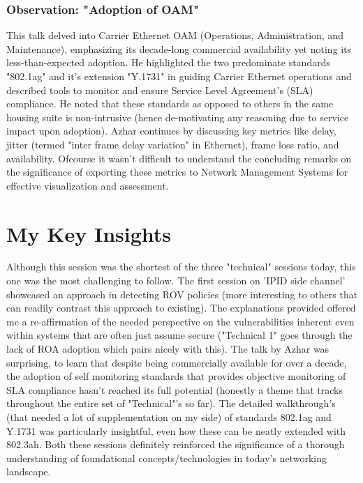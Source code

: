 \documentclass[twocolumn]{article}
\begin{document}
\subsubsection*{Observation: "Adoption of OAM"}
This talk delved into Carrier Ethernet OAM (Operations, Administration, and Maintenance), emphasizing its decade-long commercial availability yet noting its less-than-expected adoption. He highlighted the two predominate standards "802.1ag" and it's extension "Y.1731" in guiding Carrier Ethernet operations and described tools to monitor and ensure Service Level Agreement's (SLA) compliance. He noted that these standards as opposed to others in the same housing suite is non-intrusive (hence de-motivating any reasoning due to service impact upon adoption). Azhar continues by discussing key metrics like delay, jitter (termed "inter frame delay variation" in Ethernet), frame loss ratio, and availability. Ofcourse it wasn't difficult to understand the concluding remarks on the significance of exporting these metrics to Network Management Systems for effective visualization and assessment.

\section*{My Key Insights}
Although this session was the shortest of the three "technical" sessions today, this one was the most challenging to follow. The first session on 'IPID side channel' showcased an approach in detecting ROV policies (more interesting to others that can readily contrast this approach to existing). The explanations provided offered me a re-affirmation of the needed perspective on the vulnerabilities inherent even within systems that are often just assume secure ("Technical 1" goes through the lack of ROA adoption which pairs nicely with this). The talk by Azhar was surprising, to learn that despite being commercially available for over a decade, the adoption of self monitoring standards that provides objective monitoring of SLA compliance hasn't reached its full potential (honestly a theme that tracks throughout the entire set of "Technical"'s so far). The detailed walkthrough's (that needed a lot of supplementation on my side) of standards 802.1ag and Y.1731 was particularly insightful, even how these can be neatly extended with 802.3ah. Both these sessions definitely reinforced the significance of a thorough understanding of foundational concepts/technologies in today's networking landscape.


\newpage
\end{document}
